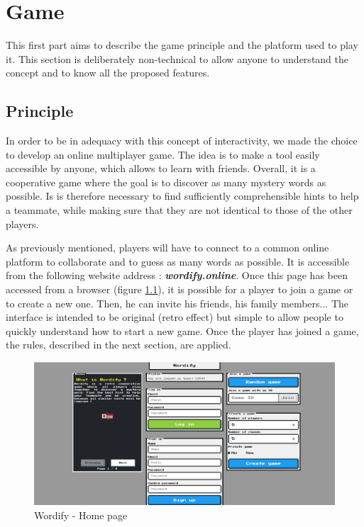 \documentclass{tnreport}
\begin{document}
\cleardoublepage

\chapter{Game}

This first part aims to describe the game principle and the platform used to play it. This section is deliberately non-technical to allow anyone to understand the concept and to know all the proposed features. 

\section{Principle}

In order to be in adequacy with this concept of interactivity, we made the choice to develop an online multiplayer game. The idea is to make a tool easily accessible by anyone, which allows to learn with friends. Overall, it is a cooperative game where the goal is to discover as many mystery words as possible. Is is therefore necessary to find sufficiently comprehensible hints to help a teammate, while making sure that they are not identical to those of the other players.

As previously mentioned, players will have to connect to a common online platform to collaborate and to guess as many words as possible. It is accessible from the following website address : \textbf{\textit{wordify.online}}. Once this page has been accessed from a browser (figure \ref{fig:wordify_home_page}), it is possible for a player to join a game or to create a new one. Then, he can invite his friends, his family members... The interface is intended to be original (retro effect) but simple to allow people to quickly understand how to start a new game. Once the player has joined a game, the rules, described in the next section, are applied. 

\bigskip

\begin{figure}[ht]
	\centering
	\fboxsep=1.2pt
	\includegraphics[scale=0.4]{figures/wordify_home_page}
	\caption{Wordify - Home page}
	\label{fig:wordify_home_page}
\end{figure} 
\end{document}
